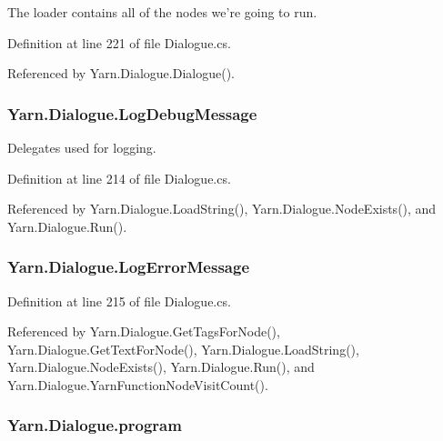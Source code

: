 The loader contains all of the nodes we're going to run. 



Definition at line 221 of file Dialogue.\-cs.



Referenced by Yarn.\-Dialogue.\-Dialogue().

\hypertarget{a00090_a381f48bb0fbb294f8cf44ca57f11be31}{
\subsubsection[{Log\-Debug\-Message}]{ Yarn.\-Dialogue.\-Log\-Debug\-Message}}\label{a00090_a381f48bb0fbb294f8cf44ca57f11be31}


Delegates used for logging. 



Definition at line 214 of file Dialogue.\-cs.



Referenced by Yarn.\-Dialogue.\-Load\-String(), Yarn.\-Dialogue.\-Node\-Exists(), and Yarn.\-Dialogue.\-Run().

\hypertarget{a00090_a9801e83dd044d6498fdf6ebcc6bec5ac}{
\subsubsection[{Log\-Error\-Message}]{ Yarn.\-Dialogue.\-Log\-Error\-Message}}\label{a00090_a9801e83dd044d6498fdf6ebcc6bec5ac}


Definition at line 215 of file Dialogue.\-cs.



Referenced by Yarn.\-Dialogue.\-Get\-Tags\-For\-Node(), Yarn.\-Dialogue.\-Get\-Text\-For\-Node(), Yarn.\-Dialogue.\-Load\-String(), Yarn.\-Dialogue.\-Node\-Exists(), Yarn.\-Dialogue.\-Run(), and Yarn.\-Dialogue.\-Yarn\-Function\-Node\-Visit\-Count().

\hypertarget{a00090_a0a1cca92325f430425d784d416cb5c2b}{
\subsubsection[{program}]{ Yarn.\-Dialogue.\-program\hspace{0.3cm}{\ttfamily [package]}}}\label{a00090_a0a1cca92325f430425d784d416cb5c2b}



